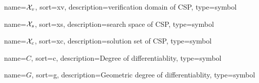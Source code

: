 	{%
		name=\ensuremath{\set{X}_{v}},
		sort=xv,
		description=verification domain of CSP,
		type=symbol
	}
	\newcommand{\verdomain}{\gls{sym:verdomain}}

	{%
		name=\ensuremath{\set{X}_{s}},
		sort=xs,
		description=search space of CSP,
		type=symbol
	}
	\newcommand{\cspsearchspace}{\gls{sym:cspsearchspace}}

	{%
		name=\ensuremath{\set{X}_{c}},
		sort=xc,
		description=solution set of CSP,
		type=symbol
	}
	\newcommand{\cspsolutionset}{\gls{sym:cspsolutionset}}

	{%
		name=\ensuremath{C},
		sort=c,
		description=Degree of differentiablity,
		type=symbol
	}
	\newcommand{\contdegbare}{\ensuremath{\gls{sym:contdegbare}}}
	\newcommand{\contdeg}[1]{\ensuremath{\contdegbare^{#1}}}

	{%
		name=\ensuremath{G},
		sort=g,
		description=Geometric degree of differentiablity,
		type=symbol
	}
	\newcommand{\contdeggeombare}{\ensuremath{\gls{sym:contdeggeombare}}}
	\newcommand{\contdeggeom}[1]{\ensuremath{\contdeggeombare^{#1}}}



